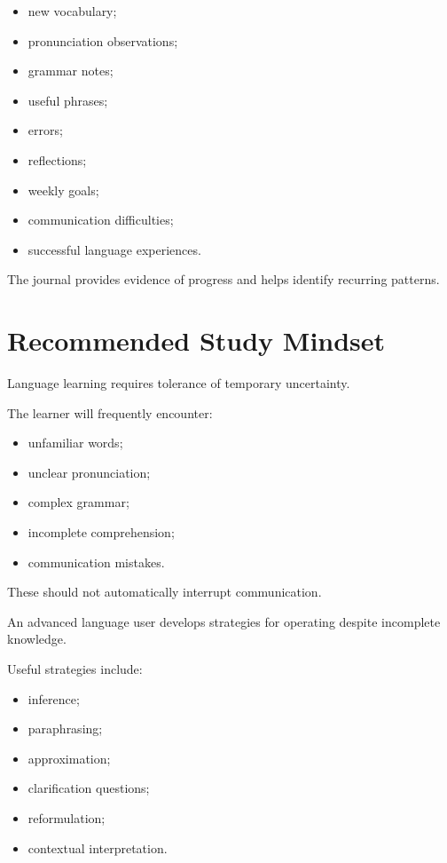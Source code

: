 \begin{itemize}
    \item new vocabulary;
    \item pronunciation observations;
    \item grammar notes;
    \item useful phrases;
    \item errors;
    \item reflections;
    \item weekly goals;
    \item communication difficulties;
    \item successful language experiences.
\end{itemize}

The journal provides evidence of progress and helps identify recurring patterns.

\section*{Recommended Study Mindset}

Language learning requires tolerance of temporary uncertainty.

The learner will frequently encounter:

\begin{itemize}
    \item unfamiliar words;
    \item unclear pronunciation;
    \item complex grammar;
    \item incomplete comprehension;
    \item communication mistakes.
\end{itemize}

These should not automatically interrupt communication.

An advanced language user develops strategies for operating despite incomplete knowledge.

Useful strategies include:

\begin{itemize}
    \item inference;
    \item paraphrasing;
    \item approximation;
    \item clarification questions;
    \item reformulation;
    \item contextual interpretation.
\end{itemize}

